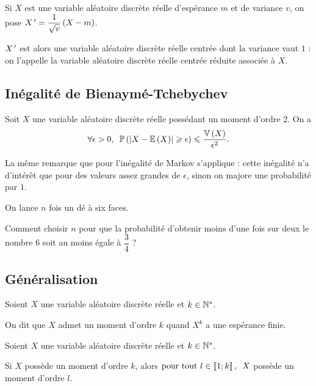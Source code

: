 \begin{rem}
Si \(X\) est une variable aléatoire discrète réelle d'espérance \(m\) et de variance \(v\), on pose \(X^{\,\prime}=\dfrac{1}{\sqrt{v}}\left(X-m\right)\).

\(X^{\,\prime}\) est alors une variable aléatoire discrète réelle centrée dont la variance vaut \(1\) : on l'appelle la variable aléatoire discrète réelle centrée réduite associée à \(X\).
\end{rem}

\subsection{Inégalité de Bienaymé-Tchebychev}

\begin{prop}
Soit \(X\) une variable aléatoire discrète réelle possédant un moment d'ordre 2. On a \[\quantifs{\forall\epsilon>0}\proba{\abs{X-\esp{X}}\geq\epsilon}\leq\dfrac{\vari{X}}{\epsilon^2}.\]
\end{prop}

La même remarque que pour l'inégalité de Markov s'applique : cette inégalité n'a d'intérêt que pour des valeurs assez grandes de \(\epsilon\), sinon on majore une probabilité par \(1\).

\begin{exo}
On lance \(n\) fois un dé à six faces.

Comment choisir \(n\) pour que la probabilité d'obtenir moins d'une fois sur deux le nombre 6 soit au moins égale à \(\dfrac{3}{4}\) ?
\end{exo}

\subsection{Généralisation}

\begin{defi}
Soient \(X\) une variable aléatoire discrète réelle et \(k\in\mathbb{N}^*\).

On dit que \(X\) admet un moment d'ordre \(k\) quand \(X^k\) a une espérance finie.
\end{defi}

\begin{prop}
Soient \(X\) une variable aléatoire discrète réelle et \(k\in\mathbb{N}^*\).

Si \(X\) possède un moment d'ordre \(k\), alors \(\quantifs{\tpt l\in\interventierii{1}{k}}X\) possède un moment d'ordre \(l\).
\end{prop}

